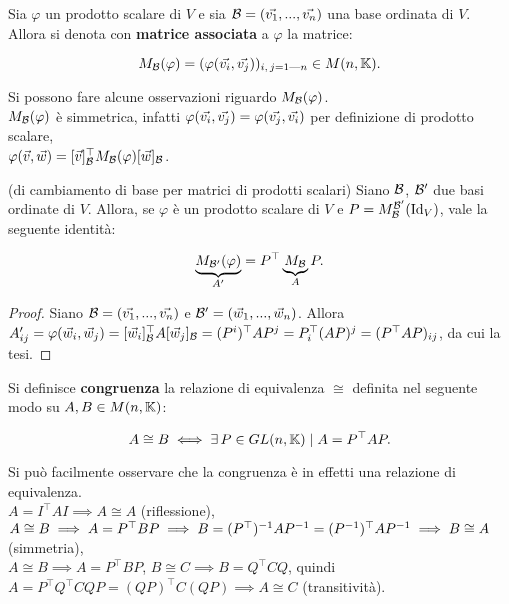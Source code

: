 \begin{definition}
	Sia $\varphi$ un prodotto scalare di $V$ e sia $\basis = (\vv1, ..., \vv{n})$ una base ordinata di $V$. Allora si denota con \textbf{matrice associata}
	a $\varphi$ la matrice:
	
	\[ M_\basis(\varphi) = (\varphi(\vv{i}, \vv{j}))_{i,\,j = 1\text{---}n} \in M(n, \KK). \] 
\end{definition}

\begin{remark}
	Si possono fare alcune osservazioni riguardo $M_{\mathcal{B}}(\varphi)$. \\
	
	\li $M_{\mathcal{B}}(\varphi)$ è simmetrica, infatti $\varphi(\vv{i}, \vv{j}) = \varphi(\vv{j}, \vv{i})$ per
	definizione di prodotto scalare, \\
	\li $\varphi(\vec{v}, \vec{w}) = [\vec{v}]_\basis^\top M_\basis(\varphi) [\vec{w}]_\basis$.
\end{remark}

\begin{theorem} (di cambiamento di base per matrici di prodotti scalari) Siano $\mathcal{B}$, $\mathcal{B}'$ due
	basi ordinate di $V$. Allora, se $\varphi$ è un prodotto scalare di $V$ e $P = M^{\mathcal{B}'}_{\mathcal{B}}(\mathrm{Id}_V)$, vale la seguente identità:
	
	\[ \underbrace{M_{\mathcal{B}'}(\varphi)}_{A'} = P^\top \underbrace{M_{\mathcal{B}}}_{A} P. \]
\end{theorem}

\begin{proof} Siano $\basis = (\vv{1}, ..., \vv{n})$ e $\basis' = (\vec{w}_1, ..., \vec{w}_n)$. Allora
	$A'_{ij} = \varphi(\vec{w}_i, \vec{w}_j) = [\vec{w}_i]_{\basis}^\top A [\vec{w}_j]_{\basis} =
	(P^i)^\top A P^j = P_i^\top (AP)^j = (P^\top AP)_{ij}$, da cui la tesi.
\end{proof}

\begin{definition}
	Si definisce \textbf{congruenza} la relazione di equivalenza $\cong$ definita nel seguente
	modo su $A, B \in M(n, \mathbb{K})$:
	
	\[ A \cong B \iff \exists P \in GL(n, \KK) \mid A = P^\top A P. \]
\end{definition}

\begin{remark}
	Si può facilmente osservare che la congruenza è in effetti una relazione di equivalenza. \\
	
	\li $A = I^\top A I \implies A \cong A$ (riflessione), \\
	\li $A \cong B \implies A = P^\top B P \implies B = (P^\top)^{-1} A P^{-1} = (P^{-1})^\top A P^{-1} \implies B \cong A$ (simmetria), \\
	\li $A \cong B \implies A = P^\top B P$, $B \cong C \implies B = Q^\top C Q$, quindi $A = P^\top Q^\top C Q P =
	(QP)^\top C (QP) \implies A \cong C$ (transitività). 
\end{remark}

